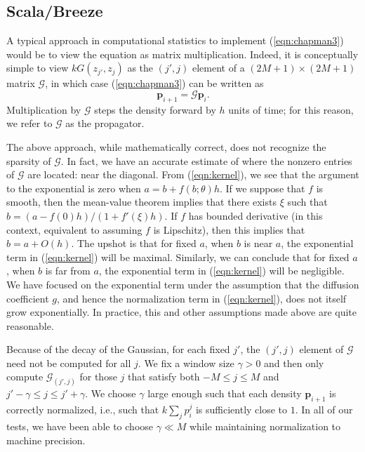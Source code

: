 \documentclass[wcp]{jmlr}
\begin{document}
\subsection{Scala/Breeze}
\label{sect:scala}
A typical approach in computational statistics to implement
(\ref{eqn:chapman3}) would be to view the equation as matrix
multiplication.  Indeed, it is conceptually simple to view
$kG(z_{j'},z_j)$ as the $(j',j)$ element of a $(2M+1)\times(2M+1)$
matrix $\mathcal{G}$, in which case (\ref{eqn:chapman3}) can be
written as
\begin{equation}
\label{eqn:matrixchapman}
\mathbf{p}_{i+1} = \mathcal{G} \mathbf{p}_i.
\end{equation}
Multiplication by $\mathcal{G}$ steps the density forward by $h$ units
of time; for this reason, we refer to $\mathcal{G}$ as the propagator.

The above approach, while mathematically correct, does not recognize the
sparsity of $\mathcal{G}$.  In fact, we have an accurate estimate of
where the nonzero entries of $\mathcal{G}$ are located: near the
diagonal.  From (\ref{eqn:kernel}), we see that the argument to the
exponential is zero when $a = b + f(b;\theta) h$.  If we
suppose that $f$ is smooth, then the mean-value theorem implies that
there exists $\xi$ such that $b = (a-f(0) h)/(1 + f'(\xi) h)$.  If $f$
has bounded derivative (in this context, equivalent to assuming $f$ is
Lipschitz), then this implies that $b = a + O(h)$.  The upshot is that
for fixed $a$, when $b$ is near $a$, the exponential term in
(\ref{eqn:kernel}) will be maximal.  Similarly, we can conclude that
for fixed $a$, when $b$ is far from $a$, the exponential term in
(\ref{eqn:kernel}) will be negligible.  We have focused on the
exponential term under the assumption that the diffusion coefficient
$g$, and hence the normalization term in (\ref{eqn:kernel}), does not
itself grow exponentially.  In practice, this and other assumptions
made above are quite reasonable.

Because of the decay of the Gaussian, for each fixed $j'$, the
$(j',j)$ element of $\mathcal{G}$ need not be computed for all $j$.
We fix a window size $\gamma > 0$ and then only compute
$\mathcal{G}_{(j',j)}$ for those $j$ that satisfy both $-M \leq j \leq
M$ and $j' - \gamma \leq j \leq j' + \gamma$.  We choose $\gamma$
large enough such that each density $\mathbf{p}_{i+1}$ is correctly
normalized, i.e., such that $k \sum_j {p}_{i}^j$ is sufficiently close
to $1$.  In all of our tests, we have been able to choose $\gamma \ll M$ 
while maintaining normalization to machine precision.
\end{document}
